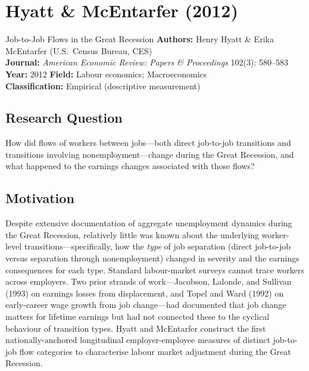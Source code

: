 \chapter{Hyatt \& McEntarfer (2012)}

\begin{paperbox}{Job-to-Job Flows in the Great Recession}
\textbf{Authors:} Henry Hyatt \& Erika McEntarfer (U.S.\ Census Bureau, CES)\\[3pt]
\textbf{Journal:} \textit{American Economic Review: Papers \& Proceedings}
102(3): 580--583\\[3pt]
\textbf{Year:} 2012 \quad\textbf{Field:} Labour economics; Macroeconomics\\[3pt]
\textbf{Classification:} Empirical (descriptive measurement)
\end{paperbox}

\section{Research Question}

How did flows of workers between jobs---both direct job-to-job transitions and
transitions involving nonemployment---change during the Great Recession, and
what happened to the earnings changes associated with those flows?

\section{Motivation}

Despite extensive documentation of aggregate unemployment dynamics during
the Great Recession, relatively little was known about the underlying worker-
level transitions---specifically, how the \emph{type} of job separation (direct
job-to-job versus separation through nonemployment) changed in severity and the
earnings consequences for each type. Standard labour-market surveys cannot trace
workers across employers. Two prior strands of work---Jacobson, Lalonde, and
Sullivan (1993) on earnings losses from displacement, and Topel and Ward (1992)
on early-career wage growth from job change---had documented that job change
matters for lifetime earnings but had not connected these to the cyclical
behaviour of transition types. Hyatt and McEntarfer construct the first
nationally-anchored longitudinal employer-employee measures of distinct
job-to-job flow categories to characterise labour market adjustment during
the Great Recession.

